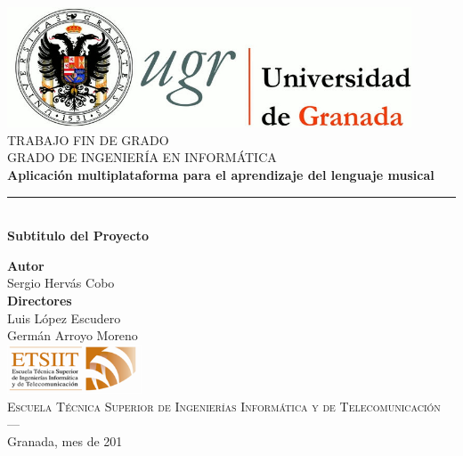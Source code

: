 \begin{titlepage}
 
 
\newlength{\centeroffset}
\setlength{\centeroffset}{-0.5\oddsidemargin}
\addtolength{\centeroffset}{0.5\evensidemargin}
\thispagestyle{empty}

\noindent\hspace*{\centeroffset}\begin{minipage}{\textwidth}

\centering
\includegraphics[width=0.9\textwidth]{imagenes/logo_ugr.jpg}\\[1.4cm]

\textsc{ \Large TRABAJO FIN DE GRADO\\[0.2cm]}
\textsc{ GRADO DE INGENIERÍA EN INFORMÁTICA}\\[1cm]
% 
{\Huge\bfseries Aplicación multiplataforma para el aprendizaje del lenguaje musical\\
}
\noindent\rule[-1ex]{\textwidth}{3pt}\\[3.5ex]
{\large\bfseries Subtitulo del Proyecto}
\end{minipage}

\vspace{1cm}
\noindent\hspace*{\centeroffset}\begin{minipage}{\textwidth}
\centering

\textbf{Autor}\\ {Sergio Hervás Cobo}\\[2.5ex]
\textbf{Directores}\\
{Luis López Escudero\\
Germán Arroyo Moreno}\\[2cm]
\includegraphics[width=0.3\textwidth]{imagenes/etsiit_logo.png}\\[0.1cm]
\textsc{Escuela Técnica Superior de Ingenierías Informática y de Telecomunicación}\\
\textsc{---}\\
Granada, mes de 201
\end{minipage}
\end{titlepage}


